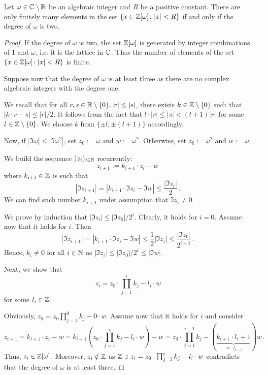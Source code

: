\begin{lem}
Let $\omega\in \mathbb{C}\setminus\mathbb{R}$ be an algebraic integer and $R$ be a positive constant. There are only finitely many elements in the set $\left\{x \in\mathbb{Z}[\omega] \colon |x|<R\right\}$ if and only if the degree of $\omega$ is two.  
\end{lem}
\begin{proof}
If the degree of $\omega$ is two, the set $\mathbb{Z}[\omega]$ is generated by integer combinations of 1 and $\omega$, i.e. it is the lattice in $\mathbb{C}$. Thus the number of elements of the set $\left\{x \in\mathbb{Z}[\omega] \colon |x|<R\right\}$ is finite.

Suppose now that the degree of $\omega$ is at least three as there are no complex algebraic integers with the degree one. 


We recall that for all $r,s\in\mathbb{R}\setminus\{0\}, |r|\leq|s|$, there exists $k\in\mathbb{Z}\setminus\{0\}$ such that $|k\cdot r -s|\leq |r|/2$. It follows from the fact that $l\cdot |r| \leq |s| <(l+1)|r| $ for some $l\in\mathbb{Z}\setminus\{0\}$. We choose $k$ from $\{\pm l,\pm(l+1)\}$ accordingly. 
 
Now, if $|\Im \omega|\leq|\Im \omega^2|$, set $z_0:=\omega$ and $w:=\omega^2$. Otherwise, set $z_0:=\omega^2$ and $w:=\omega$.   

We build the sequence $(z_i)_{i\in\mathbb{N}}$ recurrently:
$$
z_{i+1}:=k_{i+1} \cdot z_{i}-w\, 
$$
where $k_{i+1}\in\mathbb{Z}$ is such that 
$$
|\Im z_{i+1}|=|k_{i+1} \cdot\Im z_{i}-\Im w|\leq \frac{|\Im z_{i}|}{2}\,.
$$
We can find such number $k_{i+1}$ under assumption that $\Im z_{i} \neq 0$.

We prove by induction that $|\Im z_i|\leq |\Im z_0|/2^i$. Clearly, it holds for $i=0$. Assume now that it holds for $i$. Then 
$$
|\Im z_{i+1}|= |k_{i+1} \cdot \Im z_{i}- \Im w|\leq \frac{1}{2}|\Im z_i|\leq \frac{|\Im z_0|}{2^{i+1}}\,. 
$$
Hence, $k_i\neq 0$ for all $i\in\mathbb{N}$ as $|\Im z_i|\leq |\Im z_0|/2^i \leq |\Im w|$.

Next, we show that
$$
z_i=z_0 \cdot \prod_{j=1}^i k_j- l_i\cdot w
$$
for some $l_i\in\mathbb{Z}$. 

Obviously, $z_0=z_0 \prod_{j=1}^0 k_j - 0\cdot w$. Assume now that it holds for $i$ and consider
$$
z_{i+1}=k_{i+1} \cdot z_{i}-w= k_{i+1}\left(z_0 \cdot \prod_{j=1}^i k_j- l_i\cdot w\right) -w=z_0 \cdot \prod_{j=1}^{i+1} k_j - (\underbrace{k_{i+1}\cdot l_i +1}_{=:l_{i+1}})w\,.
$$
Thus, $z_i\in\mathbb{Z}[\omega]$. Moreover, $z_i\notin \mathbb{Z}$ as $\mathbb{Z}\ni z_i=z_0 \cdot \prod_{j=1}^i k_j- l_i\cdot w$ contradicts that the degree of $\omega$ is at least three.




\end{proof}
